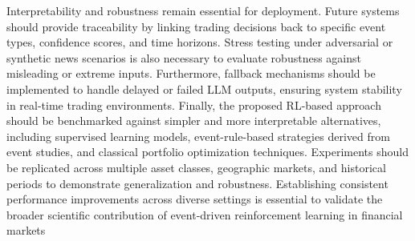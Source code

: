 \documentclass[a4paper,fleqn]{cas-sc}
\begin{document}
Interpretability and robustness remain essential for deployment. Future systems should provide traceability by linking trading decisions back to specific event types, confidence scores, and time horizons. Stress testing under adversarial or synthetic news scenarios is also necessary to evaluate robustness against misleading or extreme inputs. Furthermore, fallback mechanisms should be implemented to handle delayed or failed LLM outputs, ensuring system stability in real-time trading environments.
Finally, the proposed RL-based approach should be benchmarked against simpler and more interpretable alternatives, including supervised learning models, event-rule-based strategies derived from event studies, and classical portfolio optimization techniques. Experiments should be replicated across multiple asset classes, geographic markets, and historical periods to demonstrate generalization and robustness. Establishing consistent performance improvements across diverse settings is essential to validate the broader scientific contribution of event-driven reinforcement learning in financial markets




\end{document}

